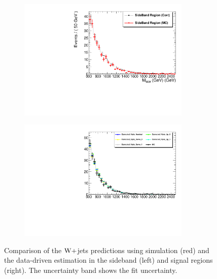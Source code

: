 \begin{figure}[!htbp] 
	 \centering 
	 \begin{subfigure}[b]{0.46\textwidth}
	 	\includegraphics[width=0.9\textwidth]{Plots/BackgroundEstimation/WV/WVchannel_SideBandRegionComparison_VjetShape_MC_CorrShapeFromData.pdf}\qquad
        \caption{ }
        \label{fig:Foil_and_Cone_a}
    \end{subfigure}
	 \begin{subfigure}[b]{0.46\textwidth}
	 	\includegraphics[width=0.9\textwidth]{Plots/BackgroundEstimation/WV/WVchannel_SignalRegionComparison_VjetShape_MC_CorrShapeFromData_38bin.pdf}\qquad
        \caption{ }
        \label{fig:Foil_and_Cone_a}
    \end{subfigure}
	 \caption{Comparison of the $\mathrm{W}+$jets predictions using simulation (red) and the data-driven estimation in the sideband (left) and signal regions (right). The uncertainty band shows the fit uncertainty.}
	 \label{fig:signal}
\end{figure}

